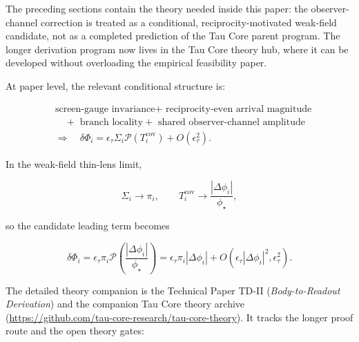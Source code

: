 \documentclass[11pt]{article}
\begin{document}
The preceding sections contain the theory needed inside this paper: the
observer-channel correction is treated as a conditional,
reciprocity-motivated weak-field candidate, not as a completed
prediction of the Tau Core parent program. The longer derivation program
now lives in the Tau Core theory hub, where it can be developed without
overloading the empirical feasibility paper.

At paper level, the relevant conditional structure is:

\[
\begin{aligned}
&\text{screen-gauge invariance}
+\text{ reciprocity-even arrival magnitude} \\
&\quad
+\text{ branch locality}
+\text{ shared observer-channel amplitude} \\
&\Longrightarrow\quad
\delta\Phi_i
=
\epsilon_\tau
\Sigma_i
\mathcal{P}(T_i^\mathrm{cov})
+O(\epsilon_\tau^2).
\end{aligned}
\]

In the weak-field thin-lens limit,

\[
\Sigma_i\to\pi_i,
\qquad
T_i^\mathrm{cov}\to\frac{|\Delta\phi_i|}{\phi_\star},
\]

so the candidate leading term becomes

\[
\delta\Phi_i
=
\epsilon_\tau
\pi_i
\mathcal{P}
\left(
\frac{|\Delta\phi_i|}{\phi_\star}
\right)
=
\epsilon_\tau\pi_i|\Delta\phi_i|
+O(\epsilon_\tau|\Delta\phi_i|^2,\epsilon_\tau^2).
\]

The detailed theory companion is the
Technical Paper TD-II (\emph{Body-to-Readout Derivation}) and the companion Tau Core theory archive (\url{https://github.com/tau-core-research/tau-core-theory}).
It tracks the longer proof route and the open theory gates:
\end{document}
